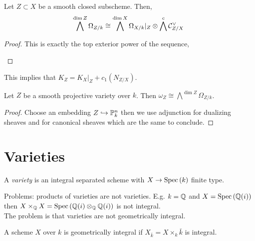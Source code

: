 \documentclass[12pt]{article}
\begin{document}
\begin{lemma}[Adjunction]
Let $Z \subset X$ be a smooth closed subscheme. Then,
\[ \bigwedge^{\dim{Z}} \Omega_{Z/k} \cong \bigwedge^{\dim{X}} \Omega_{X/k} |_Z \otimes \bigwedge^c \mathcal{C}^\vee_{Z/X} \]
\end{lemma}

\begin{proof}
This is exactly the top exterior power of the sequence,
\begin{center}
\end{center}
\end{proof}

\begin{rmk}
This implies that $K_Z = K_X |_Z + c_1(N_{Z/X})$. 
\end{rmk}

\begin{theorem}
Let $Z$ be a smooth projective variety over $k$. Then $\omega_Z \cong \bigwedge^{\dim{Z}} \Omega_{Z/k}$.
\end{theorem}

\begin{proof}
Choose an embedding $Z \hookrightarrow \mathbb{P}^n_k$ then we use adjunction for dualizing sheaves and for canonical sheaves which are the same to conclude. 
\end{proof}

\section{Varieties}

\begin{defn}
A \textit{variety} is an integral separated scheme with $X \to \mathrm{Spec}\left( k \right)$ finite type. 
\end{defn}

\begin{rmk}
Problems: products of varieties are not varieties. E.g. $k = \mathbb{Q}$ and $X = \mathrm{Spec}\left( \mathbb{Q}(i) \right)$ then $X \times_{\mathbb{Q}} X = \mathrm{Spec}\left( \mathbb{Q}(i) \otimes_{\mathbb{Q}} \mathbb{Q}(i) \right)$ is not integral.
\bigskip\\
The problem is that varieties are not geometrically integral.
\end{rmk}

\begin{defn}
A scheme $X$ over $k$ is geometrically integral if $X_{\bar{k}} = X \times_k \bar{k}$ is integral.
\end{defn}
\end{document}
